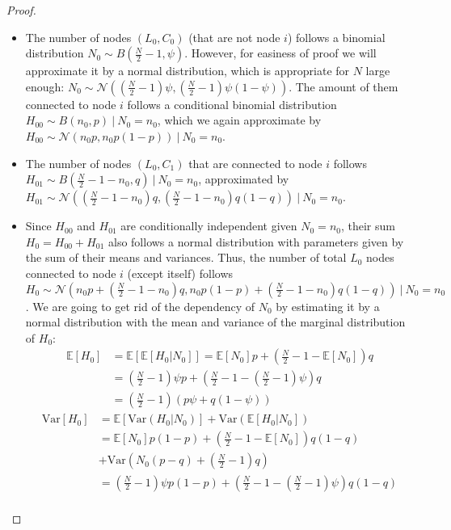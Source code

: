 \begin{proof}
\begin{itemize}
	\item The number of nodes $(L_0,C_0)$ (that are not node $i$) follows a binomial distribution $N_{0} \sim B(\frac{N}{2}-1,\psi)$. 
 However, for easiness of proof we will approximate it by a normal distribution, which is appropriate for $N$ large enough: $N_{0}\sim \mathcal {N}((\frac{N}{2}-1)\psi, (\frac{N}{2}-1)\psi(1-\psi))$.
 The amount of them connected to node $i$ follows a conditional binomial distribution $H_{00} \sim B(n_{0},p)\ |\ N_{0} = n_{0}$, which we again approximate by $H_{00} \sim  \mathcal {N}(n_{0}p, n_{0}p(1-p))\ |\ N_{0} = n_{0}$. 
	\item The number of nodes $(L_0,C_1)$ that are connected to node $i$ follows $H_{01} \sim B(\frac{N}{2}-1 - n_{0},q)\ |\ N_{0} = n_{0}$, approximated by $H_{01} \sim \mathcal {N}((\frac{N}{2}-1 - n_{0})q, (\frac{N}{2}-1 - n_{0})q(1-q))\ |\ N_{0} = n_{0}$. 
\item Since $H_{00}$ and $H_{01}$ are conditionally independent given $N_{0} = n_{0}$, their sum $H_0 = H_{00} + H_{01}$ also follows a normal distribution with parameters given by the sum of their means and variances. Thus, the number of total $L_0$ nodes connected to node $i$ (except itself) follows $H_0\sim \mathcal {N}(n_{0}p + (\frac{N}{2}-1 - n_{0})q, n_{0}p(1-p) + (\frac{N}{2}-1 - n_{0})q(1-q))\ |\ N_{0} = n_{0}$. We are going to get rid of the dependency of $N_0$ by estimating it by a normal distribution with the mean and variance of the marginal distribution of $H_0$:
 \begin{align*}
 \mathbb{E}[H_0] &= \mathbb{E}[\mathbb{E}[H_0|N_0]] = \mathbb{E}[N_0]p + \left(\frac{N}{2}-1 - \mathbb{E}[N_0]\right)q \\
 &= \left(\frac{N}{2}-1\right)\psi p + \left(\frac{N}{2}-1 - \left(\frac{N}{2}-1\right)\psi\right)q \\
 &= \left(\frac{N}{2}-1\right) (p \psi + q (1-\psi))
 \end{align*}
 \begin{align*}
 \text{Var}[H_0] &= \mathbb{E}[\text{Var}(H_0|N_0)]+\text{Var}(\mathbb{E}[H_0|N_0]) \\
 &= \mathbb{E}[N_{0}]p(1-p) + \left(\frac{N}{2}-1 - \mathbb{E}[N_{0}]\right)q(1-q) \\
 &+  \text{Var}\left(N_0(p-q) + \left(\frac{N}{2}-1\right)q\right) \\ 
 &= \left(\frac{N}{2}-1\right)\psi p(1-p) + \left(\frac{N}{2}-1 - \left(\frac{N}{2}-1\right)\psi\right)q(1-q) \\

\end{align*}
\end{itemize}
\end{proof}

